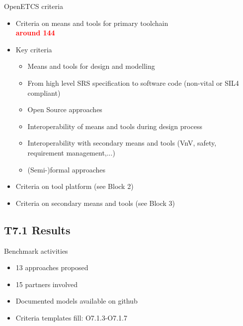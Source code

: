 \begin{frame}{OpenETCS criteria}

  \begin{itemize}
  \item
  Criteria on means and tools for primary toolchain \\
\hspace{3cm}    \textcolor{red}{\textbf{around 144 }}
    \item 
    \pause
    Key criteria
      \begin{itemize}
	  \item
 	   Means and tools for design and modelling
 	       \pause
 	  \item
 	   From high level SRS specification to software code (non-vital or SIL4 compliant)
 	       \pause
 	  \item
 	   Open Source approaches
 	       \pause
 	  \item 
 	   Interoperability of means and tools during design process
 	       \pause
 	   \item
 	   Interoperability with secondary means and tools (VnV, safety, requirement management,...) 
 	       \pause
 	   \item
 	   (Semi-)formal approaches
	  \end{itemize}
	   	       \pause

	 \item
	 Criteria on tool platform (see Block 2)
	 \item
	 Criteria on secondary means and tools (see Block 3)
  
  \end{itemize}
  

\end{frame}


\subsection{T7.1 Results}

\begin{frame}{Benchmark activities}
 
  \begin{itemize}
  \item
	13 approaches proposed     
	
    \item 
    15 partners involved
 	\item
 	Documented models available on github
 	\item 
 	Criteria templates fill: O7.1.3-O7.1.7 

  \end{itemize}
 	    
\begin{center}

 
\end{center}

\end{frame}

